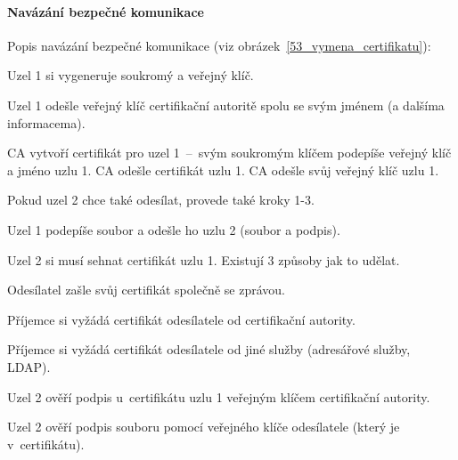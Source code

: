 \paragraph*{Navázání bezpečné komunikace} Popis navázání bezpečné komunikace (viz obrázek~\ref{53_vymena_certifikatu}):
\begin{compactenum}
    \item Uzel 1 si vygeneruje soukromý a veřejný klíč.

    \item Uzel 1 odešle veřejný klíč certifikační autoritě spolu se svým jménem (a dalšíma informacema).

    \item CA vytvoří certifikát pro uzel 1~--~svým soukromým klíčem podepíše veřejný klíč a jméno uzlu 1. CA odešle certifikát uzlu 1. CA odešle svůj veřejný klíč uzlu 1.

    \item Pokud uzel 2 chce také odesílat, provede také kroky 1-3.

    \item Uzel 1 podepíše soubor a odešle ho uzlu 2 (soubor a podpis).

    \item Uzel 2 si musí sehnat certifikát uzlu 1. Existují 3 způsoby jak to udělat. \begin{compactitem}
        \item Odesílatel zašle svůj certifikát společně se zprávou.
        \item Příjemce si vyžádá certifikát odesílatele od certifikační autority.
        \item Příjemce si vyžádá certifikát odesílatele od jiné služby (adresářové služby, LDAP).
    \end{compactitem}

    \item Uzel 2 ověří podpis u~certifikátu uzlu 1 veřejným klíčem certifikační autority.

    \item Uzel 2 ověří podpis souboru pomocí veřejného klíče odesílatele (který je v~certifikátu).
\end{compactenum}

